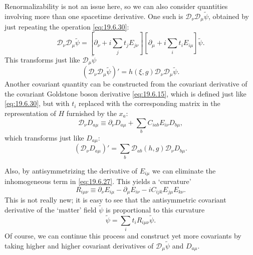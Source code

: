Renormalizability is not an issue here, so we can also consider quantities involving more than one spacetime derivative. One such is $\mathcal D_\nu\mathcal D_\mu\widetilde\psi$, obtained by just repeating the operation \eqref{eq:19.6.30}:
\begin{equation}
\mathcal D_\nu\mathcal D_\mu\widetilde\psi
=\left[\partial_\nu+i\sum_jt_jE_{j\nu}\right]
\left[\partial_\mu+i\sum_it_iE_{i\mu}\right]\widetilde\psi.
\tag{19.6.31}\label{eq:19.6.31}
\end{equation}
This transforms just like $\mathcal D_\mu\widetilde\psi$
\begin{equation}
\left(\mathcal D_\nu\mathcal D_\mu\widetilde\psi\right)'
=h(\xi,g)\mathcal D_\nu\mathcal D_\mu\widetilde\psi.
\tag{19.6.32}\label{eq:19.6.32}
\end{equation}
Another covariant quantity can be constructed from the covariant derivative of the covariant Goldstone boson derivative \eqref{eq:19.6.15}, which is defined just like \eqref{eq:19.6.30}, but with $t_i$ replaced with the corresponding matrix in the representation of $H$ furnished by the $x_a$:
\begin{equation}
\mathcal D_\nu D_{a\mu}
\equiv\partial_\nu D_{a\mu}
+\sum_b C_{iab}E_{i\nu}D_{b\mu},
\tag{19.6.33}\label{eq:19.6.33}
\end{equation}
which transforms just like $D_{a\mu}$:
\begin{equation}
\left(\mathcal D_\nu D_{a\mu}\right)'
=\sum_b\mathcal D_{ab}(h,g)\mathcal D_\nu D_{b\mu}.
\tag{19.6.34}\label{eq:19.6.34}
\end{equation}

Also, by antisymmetrizing the derivative of $E_{i\mu}$ we can eliminate the inhomogeneous term in \eqref{eq:19.6.27}. This yields a `curvature'
\begin{equation}
R_{i\mu\nu}
\equiv\partial_\nu E_{i\mu}-\partial_\mu E_{i\nu}
-iC_{ijk}E_{j\mu}E_{k\nu}.
\tag{19.6.35}\label{eq:19.6.35}
\end{equation}
This is not really new; it is easy to see that the antisymmetric covariant derivative of the `matter' field $\widetilde\psi$ is proportional to this curvature
\begin{equation}
[\mathcal D_\nu,\mathcal D_\mu]\widetilde\psi
=\sum_i t_iR_{i\mu\nu}\widetilde\psi.
\tag{19.6.36}\label{eq:19.6.36}
\end{equation}
Of course, we can continue this process and construct yet more covariants by taking higher and higher covariant derivatives of $\mathcal D_\mu\widetilde\psi$ and $D_{a\mu}$.

